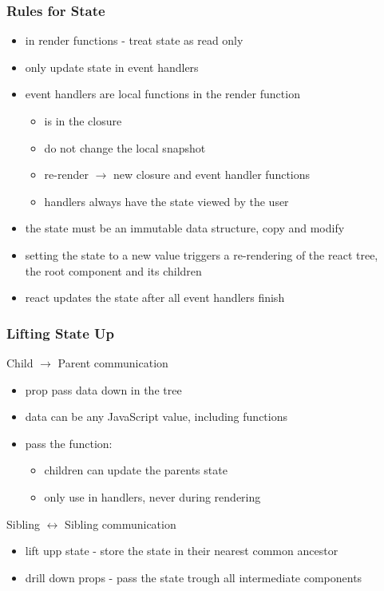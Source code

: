 \begin{frame}[fragile] \frametitle{Rules for State}
\begin{itemize}
  \item in render functions - treat state as read only
  \item only update state in event handlers
  \item event handlers are local functions in the render function
  \begin{itemize}
    \item {} is in the closure
    \item {} do not change the local snapshot
    \item re-render $\rightarrow$ new closure and event handler functions
    \item handlers always have the state viewed by the user
  \end{itemize}
  \item the state must be an immutable data structure, copy and modify
  \item setting the state to a new value triggers a re-rendering of the react tree,
           \\the root component and its children
  \item react updates the state after all event handlers finish
\end{itemize}
\end{frame}

\begin{frame}[fragile] \frametitle{Lifting State Up}
Child $\rightarrow$ Parent communication
\begin{itemize}
  \item prop pass data down in the tree
  \item data can be any JavaScript value, including functions
  \item pass the  function:
  \begin{itemize}
    \item children can update the parents state
    \item only use in handlers, never during rendering
  \end{itemize}
\end{itemize}
Sibling $\leftrightarrow$ Sibling communication
\begin{itemize}
  \item lift upp state - store the state in their nearest common ancestor
  \item drill down props - pass the state trough all intermediate components
\end{itemize}
\end{frame}

